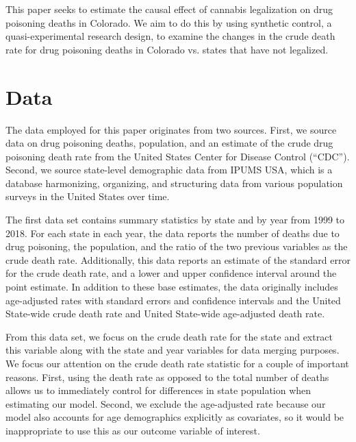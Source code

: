 \documentclass{article}
\begin{document}
This paper seeks to estimate the causal effect of cannabis legalization on drug poisoning deaths in Colorado. We aim to do this by using synthetic control, a quasi-experimental research design, to examine the changes in the crude death rate for drug poisoning deaths in Colorado vs. states that have not legalized. 

\section{Data}

The data employed for this paper originates from two sources. First, we source data on drug poisoning deaths, population, and an estimate of the crude drug poisoning death rate from the United States Center for Disease Control (``CDC''). Second, we source state-level demographic data from IPUMS USA, which is a database harmonizing, organizing, and structuring data from various population surveys in the United States over time.

The first data set contains summary statistics by state and by year from 1999 to 2018. For each state in each year, the data reports the number of deaths due to drug poisoning, the population, and the ratio of the two previous variables as the crude death rate. Additionally, this data reports an estimate of the standard error for the crude death rate, and a lower and upper confidence interval around the point estimate. In addition to these base estimates, the data originally includes age-adjusted rates with standard errors and confidence intervals and the United State-wide crude death rate and United State-wide age-adjusted death rate. 

From this data set, we focus on the crude death rate for the state and extract this variable along with the state and year variables for data merging purposes. We focus our attention on the crude death rate statistic for a couple of important reasons. First, using the death rate as opposed to the total number of deaths allows us to immediately control for differences in state population when estimating our model. Second, we exclude the age-adjusted rate because our model also accounts for age demographics explicitly as covariates, so it would be inappropriate to use this as our outcome variable of interest.
\end{document}
